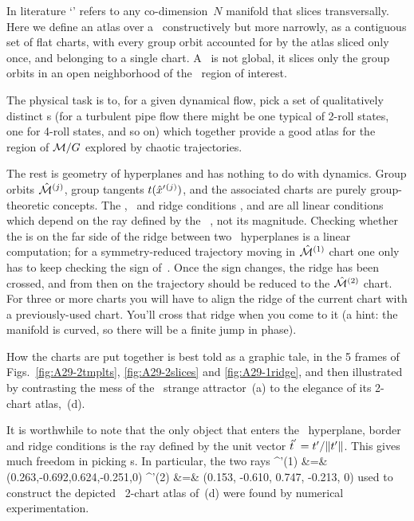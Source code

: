\documentclass[aip,cha,reprint,
secnumarabic,
nofootinbib, tightenlines,
nobibnotes, showkeys, showpacs,
groupedaddress
]{revtex4-1}
\begin{document}


In literature `\slice' refers to any
co-dimension~$N$ manifold that slices transversally. Here we define
an atlas over a \slice\ constructively but more narrowly, as a contiguous
set of flat charts, with every group orbit accounted for by the
atlas sliced only once, and belonging to a single chart. A \slice\ is not
global, it slices only the group orbits in an open neighborhood of the
\statesp\ region of interest.

The physical task is to, for a given dynamical flow, pick a set of
qualitatively distinct {\template s} (for a turbulent pipe
flow there might be one typical of 2-roll states, one for 4-roll states, and so on)
which together provide a good atlas for the region of ${\cal M}/G$
explored by chaotic trajectories.

The rest is geometry of hyperplanes and has nothing to do with dynamics.
Group orbits $\hat{\cal M}{}^{(j)}$, group tangents
$t({\hat{x}'}{}^{(j)})$, and the associated charts are purely
group-theoretic concepts. The \slice, \chartBord\ and ridge conditions
,  and  are all linear
conditions which depend on the ray defined by the \template\ \slicep, not
its magnitude. Checking whether the {\chartBord} is on the far side of
the ridge between two \slice\ hyperplanes is a linear computation; for a
symmetry-reduced trajectory moving in $\hat{\cal M}{}^{(1)}$ chart one only has
to keep checking the sign of
\beq
{}
\,.
Once the sign changes, the ridge has been crossed, and from then on
the trajectory should be reduced to the $\pSRed{}^{(2)}$ chart.
For three or more charts you will have to align the ridge of the current
chart with a previously-used chart. You'll cross that ridge when you come
to it (a hint: the manifold is curved, so there will be a finite jump in
phase).

How the charts are put together is best told as a graphic tale, in the 5
frames of Figs.~\ref{fig:A29-2tmplts}, \ref{fig:A29-2slices} and
\ref{fig:A29-1ridge}, and then illustrated by contrasting the mess of the
\cLe\ strange attractor \,(a) to the elegance of
its 2-chart atlas, \,(d).

It is worthwhile to note that the only object that enters the \slice\
hyperplane, border and ridge conditions is the ray defined by the unit
vector $\hat{t}{}^{'}= \sliceTan{}/\Norm{\sliceTan{}}$. This gives much
freedom in picking \template s. In particular, the two rays
\bea
{}^{'(1)} &=& (0.263,-0.692,0.624,-0.251,0)
    \continue
{}^{'(2)} &=& (0.153, -0.610, 0.747, -0.213, 0)
\label{DanielTmpls2}
\eea
used to construct the depicted \cLe\ 2-chart atlas of
\,(d) were found by numerical experimentation.
\end{document}
